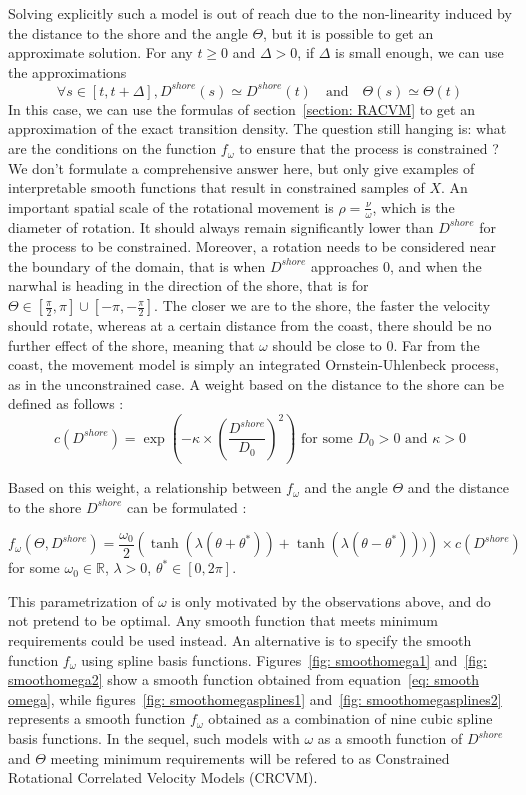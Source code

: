 \documentclass[11pt]{article}
\newcommand {\R}{\mathbb{R}}
\newcommand {\1}{\mathbb{1}}
\theoremstyle{definition}
\theoremstyle{remark}
\theoremstyle{remark}
\begin{document}
Solving explicitly such a model is out of reach due to the non-linearity induced by the distance to the shore and the angle $\Theta$, but it is possible to get an approximate solution.
For any $t \geq 0$ and $\Delta>0$, if $\Delta$ is small enough, we can use the approximations
\[\forall s \in [t,t+\Delta], D^{shore}(s) \simeq D^{shore}(t) \quad \mbox{and} \quad  \Theta(s)\simeq \Theta(t)\]
In this case, we can use the formulas of section~\ref{section: RACVM} to get an approximation of the exact transition density.
The question still hanging is: what are the conditions on the function $f_{\omega}$ to ensure that the process is constrained ?
We don't formulate a comprehensive answer here, but only give examples of interpretable smooth functions that result in constrained samples of $X$.
An important spatial scale of the rotational movement is $\rho=\frac{\nu}{\omega}$, which is the diameter of rotation. It should always remain significantly lower than $D^{shore}$ for the process to be constrained. Moreover, a rotation needs to be considered near the boundary of the domain, that is when $D^{shore}$ approaches $0$, and when the narwhal is heading in the direction of the shore, that is for $\Theta \in \left[\frac{\pi}{2},\pi\right] \cup \left[-\pi,-\frac{\pi}{2}\right]$.
The closer we are to the shore, the faster the velocity should rotate,
whereas at a certain distance from the coast, there should be no further effect of the shore, meaning that $\omega$ should be close to $0$. Far from the coast, the movement model is simply an integrated Ornstein-Uhlenbeck process, as in the unconstrained case.
A weight based on the distance to the shore can be defined as follows :
\[c(D^{shore})=\exp\left(-\kappa \times \left(\frac{D^{shore}}{D_0}\right)^2\right)\mbox{ for some } D_0>0 \mbox{ and } \kappa>0\]

Based on this weight, a relationship between $f_{\omega}$ and the angle $\Theta$ and the distance to the shore $D^{shore}$ can be formulated  :

\begin{equation}
f_{\omega}(\Theta,D^{shore})=\frac{\omega_0}{2}\left(\tanh(\lambda(\theta+\theta^{*}))+\tanh(\lambda(\theta-\theta^{*})))\right)\times c(D^{shore})
\label{eq: smooth omega}
\end{equation}
for some $\omega_0 \in \R$, $\lambda>0$, $\theta^* \in [0,2\pi]$.

This parametrization of $\omega$ is only motivated by the observations above, and do not pretend to be optimal. Any smooth function that meets minimum requirements could be used instead. An alternative is to specify the smooth function $f_{\omega}$ using spline basis functions. Figures~\ref{fig: smoothomega1} and~\ref{fig: smoothomega2} show a smooth function obtained from equation~\ref{eq: smooth omega}, while figures~\ref{fig: smoothomegasplines1} and~\ref{fig: smoothomegasplines2}  represents a smooth function $f_{\omega}$ obtained as a combination of nine cubic spline basis functions. In the sequel, such models with $\omega$ as a smooth function of $D^{shore}$ and $\Theta$ meeting minimum requirements will be refered to as Constrained Rotational Correlated Velocity Models (CRCVM).
\end{document}
